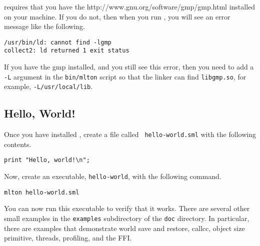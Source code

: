 {\mlton} requires that you have the
		  {http://www.gnu.org/software/gmp/gmp.html}
installed on your machine.  If you do not, then when you run {\mlton},
you will see an error message like the following.
\begin{verbatim}
/usr/bin/ld: cannot find -lgmp
collect2: ld returned 1 exit status
\end{verbatim}
If you have the gmp installed, and you still see this error, then you need to
add a {\tt -L} argument in the {\tt bin/mlton} script so that the linker can
find {\tt libgmp.so}, for example, {\tt -L/usr/local/lib}.

\subsection{Hello, World!}

Once you have installed {\mlton}, create a file called {\tt
hello-world.sml} with the following contents.

\begin{verbatim}
print "Hello, world!\n";
\end{verbatim}
Now, create an executable, {\tt hello-world}, with the following command.
\begin{verbatim}
mlton hello-world.sml
\end{verbatim}
You can now run this executable to verify that it works.  There are
several other small examples in the {\tt examples} subdirectory of the
{\tt doc} directory.  In particular, there are examples that
demonstrate world save and restore, callcc, object size primitive,
threads, profiling, and the FFI.
